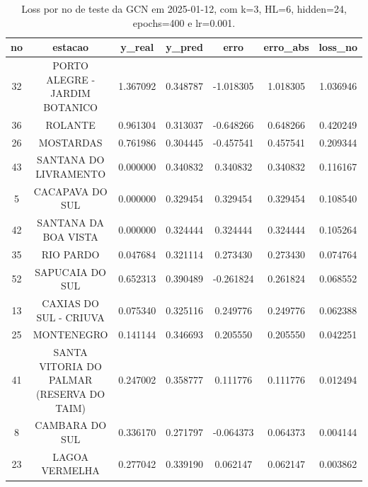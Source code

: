\begin{table}[h]
\centering
\caption{Loss por no de teste da GCN em 2025-01-12, com k=3, HL=6, hidden=24, epochs=400 e lr=0.001.}
\label{tab:gcn_loss_k3_hl6_h24_e400_d20250112}
\begin{tabular}{ccccccc}
\toprule
no & estacao & y\_real & y\_pred & erro & erro\_abs & loss\_no \\
\midrule
32 & PORTO ALEGRE - JARDIM BOTANICO & 1.367092 & 0.348787 & -1.018305 & 1.018305 & 1.036946 \\
36 & ROLANTE & 0.961304 & 0.313037 & -0.648266 & 0.648266 & 0.420249 \\
26 & MOSTARDAS & 0.761986 & 0.304445 & -0.457541 & 0.457541 & 0.209344 \\
43 & SANTANA DO LIVRAMENTO & 0.000000 & 0.340832 & 0.340832 & 0.340832 & 0.116167 \\
5 & CACAPAVA DO SUL & 0.000000 & 0.329454 & 0.329454 & 0.329454 & 0.108540 \\
42 & SANTANA DA BOA VISTA & 0.000000 & 0.324444 & 0.324444 & 0.324444 & 0.105264 \\
35 & RIO PARDO & 0.047684 & 0.321114 & 0.273430 & 0.273430 & 0.074764 \\
52 & SAPUCAIA DO SUL & 0.652313 & 0.390489 & -0.261824 & 0.261824 & 0.068552 \\
13 & CAXIAS DO SUL - CRIUVA & 0.075340 & 0.325116 & 0.249776 & 0.249776 & 0.062388 \\
25 & MONTENEGRO & 0.141144 & 0.346693 & 0.205550 & 0.205550 & 0.042251 \\
41 & SANTA VITORIA DO PALMAR (RESERVA DO TAIM) & 0.247002 & 0.358777 & 0.111776 & 0.111776 & 0.012494 \\
8 & CAMBARA DO SUL & 0.336170 & 0.271797 & -0.064373 & 0.064373 & 0.004144 \\
23 & LAGOA VERMELHA & 0.277042 & 0.339190 & 0.062147 & 0.062147 & 0.003862 \\
\bottomrule
\end{tabular}
\end{table}
